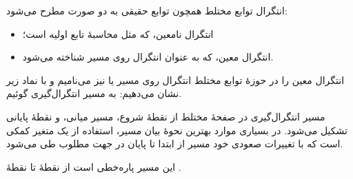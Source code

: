 \EMhold


\begin{EMunit}

انتگرال توابع مختلط همچون توابع حقیقی به دو صورت مطرح می‌شود:

\begin{itemize}
\tightlist
\item
  انتگرال نامعین، که مثل محاسبهٔ تابع اولیه است؛
\item
  انتگرال معین، که به عنوان انتگرال روی مسیر شناخته می‌شود.
\end{itemize}

\end{EMunit}

\begin{EMunit}

انتگرال معین را در حوزهٔ توابع مختلط انتگرال روی مسیر یا  نیز می‌نامیم و با نماد زیر نشان می‌دهیم:
به  مسیر انتگرال‌گیری گوئیم.


\end{EMunit}

\EMhold


\begin{EMunit}

مسیر انتگرال‌گیری در صفحهٔ مختلط از نقطهٔ شروع، مسیر میانی، و نقطهٔ پایانی تشکیل می‌شود. در بسیاری موارد بهترین نحوهٔ بیان مسیر، استفاده از یک متغیر کمکی است که با تغییرات صعودی خود مسیر از ابتدا تا پایان در جهت مطلوب طی می‌شود.



\end{EMunit}

\begin{EMexample}{}

این مسیر پاره‌خطی است از نقطهٔ  تا نقطهٔ .

\end{EMexample}

